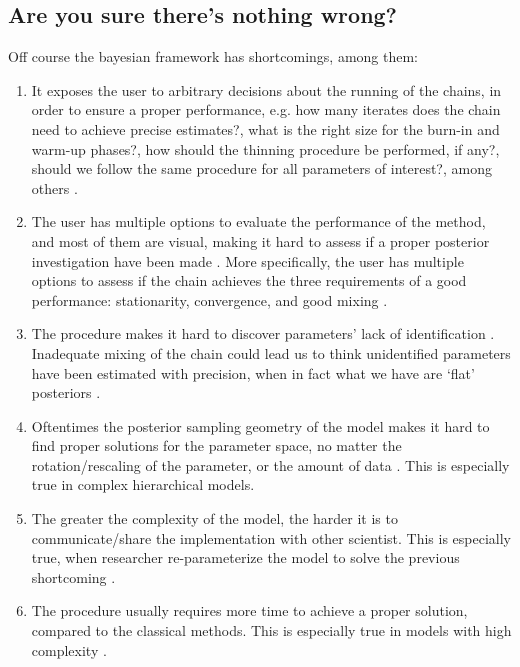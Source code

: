 
\subsection{Are you sure there's nothing wrong?}
Off course the bayesian framework has shortcomings, among them:

\begin{enumerate}	
	\item It exposes the user to arbitrary decisions about the running of the chains, in order to ensure a proper performance, e.g. how many iterates does the chain need to achieve precise estimates?, what is the right size for the burn-in and warm-up phases?, how should the thinning procedure be performed, if any?, should we follow the same procedure for all parameters of interest?, among others \cite{Skrondal_et_al_2004a}. 
	
	\item The user has multiple options to evaluate the performance of the method, and most of them are visual, making it hard to assess if a proper posterior investigation have been made \cite{Gelman_et_al_1996}. More specifically, the user has multiple options to assess if the chain achieves the three requirements of a good performance: stationarity, convergence, and good mixing \cite{McElreath_2020}. 
	
	\item The procedure makes it hard to discover parameters' lack of identification \cite{Skrondal_et_al_2004a}. Inadequate mixing of the chain could lead us to think unidentified parameters have been estimated with precision, when in fact what we have are `flat' posteriors \cite{Keane_1992}.
	
	\item Oftentimes the posterior sampling geometry of the model makes it hard to find proper solutions for the parameter space, no matter the rotation/rescaling of the parameter, or the amount of data \cite{Betancourt_et_al_2013}. This is especially true in complex hierarchical models.
	
	\item The greater the complexity of the model, the harder it is to communicate/share the implementation with other scientist. This is especially true, when researcher re-parameterize the model to solve the previous shortcoming \cite{McElreath_2020}.
	
	\item The procedure usually requires more time to achieve a proper solution, compared to the classical methods. This is especially true in models with high complexity \cite{Tarazona_2013, Rivera_2019}.
\end{enumerate}

